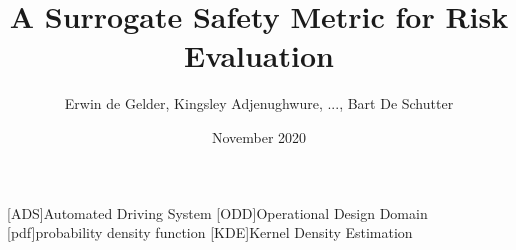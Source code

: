 \documentclass{article}
\title{A Surrogate Safety Metric for Risk Evaluation}
\author{Erwin de Gelder, Kingsley Adjenughwure, ..., Bart De Schutter}
\date{November 2020}
\begin{document}
\begin{acronym}[AAAAAAAA]
	[ADS]{Automated Driving System}
	[ODD]{Operational Design Domain}
	[pdf]{probability density function}
	[KDE]{Kernel Density Estimation}
\end{acronym}

\maketitle











\printbibliography
\end{document}
